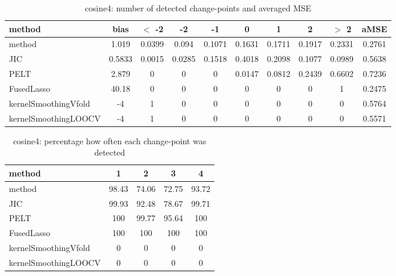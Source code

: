 \begin{table}[ht]
\centering
\begin{tabular}{l|c|ccccccc|c}
  \hline
method & bias & $<$ -2 & -2 & -1 & 0 & 1 & 2 & $>$ 2 & aMSE \\ 
  \hline
method & 1.019 & 0.0399 & 0.094 & 0.1071 & 0.1631 & 0.1711 & 0.1917 & 0.2331 & 0.2761 \\ 
  JIC & 0.5833 & 0.0015 & 0.0285 & 0.1518 & 0.4018 & 0.2098 & 0.1077 & 0.0989 & 0.5638 \\ 
  PELT & 2.879 &     0 &     0 &     0 & 0.0147 & 0.0812 & 0.2439 & 0.6602 & 0.7236 \\ 
  FusedLasso & 40.18 &     0 &     0 &     0 &     0 &     0 &     0 &     1 & 0.2475 \\ 
  kernelSmoothingVfold &    -4 &     1 &     0 &     0 &     0 &     0 &     0 &     0 & 0.5764 \\ 
  kernelSmoothingLOOCV &    -4 &     1 &     0 &     0 &     0 &     0 &     0 &     0 & 0.5571 \\ 
   \hline
\end{tabular}
\caption{cosine4: number of detected change-points and averaged MSE} 
\label{tab:cosine4Njumps}
\end{table}
\begin{table}[ht]
\centering
\begin{tabular}{l|cccc}
  \hline
method & 1 & 2 & 3 & 4 \\ 
  \hline
method &  98.43 &  74.06 &  72.75 &  93.72 \\ 
  JIC &  99.93 &  92.48 &  78.67 &  99.71 \\ 
  PELT &    100 &  99.77 &  95.64 &    100 \\ 
  FusedLasso &    100 &    100 &    100 &    100 \\ 
  kernelSmoothingVfold &      0 &      0 &      0 &      0 \\ 
  kernelSmoothingLOOCV &      0 &      0 &      0 &      0 \\ 
   \hline
\end{tabular}
\caption{cosine4: percentage how often each change-point was detected} 
\label{tab:cosine4Detections}
\end{table}
